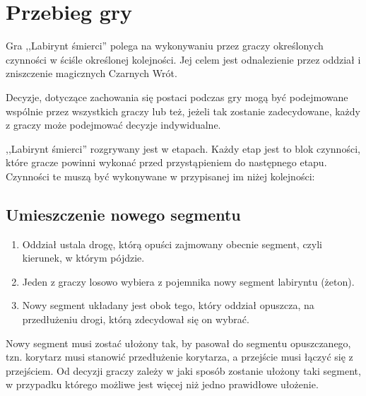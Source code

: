 \section{Przebieg gry}

Gra ,,Labirynt śmierci'' polega na wykonywaniu przez graczy określonych czynności w ściśle określonej kolejności.
Jej celem jest odnalezienie przez oddział i zniszczenie magicznych Czarnych Wrót.

Decyzje, dotyczące zachowania się postaci podczas gry mogą być podejmowane wspólnie przez wszystkich graczy lub też, jeżeli tak zostanie zadecydowane, każdy z graczy może podejmować decyzje indywidualne.

,,Labirynt śmierci'' rozgrywany jest w etapach.
Każdy etap jest to blok czynności, które gracze powinni wykonać przed przystąpieniem do następnego etapu.
Czynności te muszą być wykonywane w przypisanej im niżej kolejności:

\subsection{Umieszczenie nowego segmentu}
\begin{enumerate}
    \item
        Oddział ustala drogę, którą opuści zajmowany obecnie segment, czyli kierunek, w którym pójdzie.
    \item
        Jeden z graczy losowo wybiera z pojemnika nowy segment labiryntu (żeton).
    \item
        Nowy segment układany jest obok tego, który oddział opuszcza, na przedłużeniu drogi, którą zdecydował się on wybrać.
\end{enumerate}

Nowy segment musi zostać ułożony tak, by pasował do segmentu opuszczanego, tzn. korytarz musi stanowić przedłużenie korytarza, a przejście musi łączyć się z przejściem.
Od decyzji graczy zależy w jaki sposób zostanie ułożony taki segment, w przypadku którego możliwe jest więcej niż jedno prawidłowe ułożenie.

